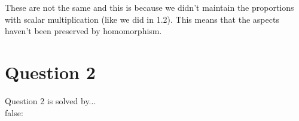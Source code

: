 \documentclass[10pt]{article}
\begin{document}
\vspace{0.1in}
\noindent These are not the same and this is because we didn't maintain the proportions with scalar multiplication (like we did in 1.2). This means that the aspects haven't been preserved by homomorphism. 







\vspace{0.2in}
\section{Question 2}
\noindent Question 2 is solved by...
\vspace{0.2in}
\\








\if false:
\end{document}
